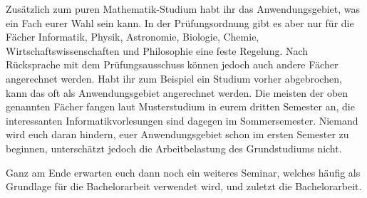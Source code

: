 Zusätzlich zum puren Mathematik-Studium habt ihr das Anwendungsgebiet, was ein Fach eurer Wahl sein kann.  In der Prüfungsordnung gibt es aber nur für die Fächer Informatik, Physik, Astronomie, Biologie, Chemie, Wirtschaftswissenschaften und Philosophie eine feste Regelung. Nach Rücksprache mit dem Prüfungsausschuss können jedoch auch andere Fächer angerechnet werden. Habt ihr zum Beispiel ein Studium vorher abgebrochen, kann das oft als Anwendungsgebiet angerechnet werden.  Die meisten der oben genannten Fächer fangen laut Musterstudium in eurem dritten Semester an, die interessanten Informatikvorlesungen sind dagegen im Sommersemester.  Niemand wird euch daran hindern, euer Anwendungsgebiet schon im ersten Semester zu beginnen, unterschätzt jedoch die Arbeitbelastung des Grundstudiums nicht.

Ganz am Ende erwarten euch dann noch ein weiteres Seminar, welches häufig als Grundlage für die Bachelorarbeit verwendet wird, und zuletzt die Bachelorarbeit.
